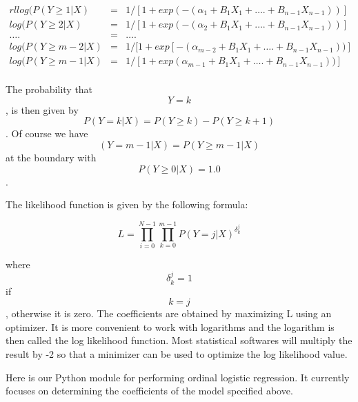 \begin{eqnarray*}{rl}
    log (P(Y\ge 1|X) &=& 1/[1 + exp(-(\alpha_1 + B_1 X_1 + ….+ B_{n-1} X_{n-1}))]\\
    log (P(Y\ge 2|X) &=& 1/[1+exp(-(\alpha_2 + B_1 X_1 + ….+ B_{n-1} X_{n-1}))]\\
    …. &=& …. \\
    log (P(Y \ge m-2|X) &=& 1/ [1 + exp[-( \alpha_{m-2}+ B_1 X_1 + ….+ B_{n-1} X_{n-1}))]\\
    log (P(Y \ge m-1|X) &=& 1/ [1 + exp(\alpha_{m-1}+ B_1 X_1 + ….+ B_{n-1} X_{n-1}))]\\
\end{eqnarray*}

The probability that $$Y = k$$, is then given by $$P(Y = k|X) = P(Y\ge k) -P(Y\ge k+1)$$. Of course we have $$(Y = m-1|X) = P(Y\ge m-1|X)$$ at the boundary with $$P(Y\ge 0|X) = 1.0$$.

The likelihood function is given by the following formula:

$$L=\prod_{i= 0}^{N-1} \prod_{k=0}^{m-1 }P(Y= j|X)^{\delta_k^j}$$

where $$\delta_k^j= 1$$ if $$k = j$$, otherwise it is zero. The coefficients are obtained by maximizing L using an optimizer. It is more convenient to work with logarithms and the logarithm is then called the log likelihood function. Most statistical softwares will multiply the result by -2 so that a minimizer can be used to optimize the log likelihood value.

Here is our Python module for performing ordinal logistic regression. It currently focuses on determining the coefficients of the model specified above. 